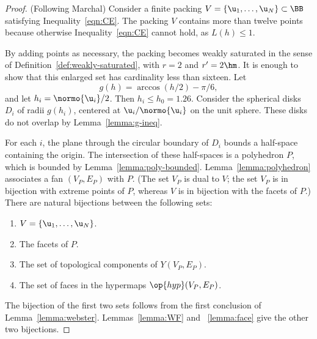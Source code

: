 \begin{proof} (Following Marchal) Consider a finite packing $
  V=\{\u_1,\ldots, \u_N\}\subset \BB$ satisfying
  Inequality~\ref{eqn:CE}.  The packing $V$ contains more than twelve
  points because otherwise Inequality~\ref{eqn:CE} cannot hold, as
  $L(h)\le 1$.

  By adding points as necessary, the packing becomes weakly saturated
  in the sense of Definition~\ref{def:weakly-saturated}, with $r=2$
  and $r'=2\hm$.  It is enough to show that this enlarged set has
  cardinality less than sixteen.  Let
\[ %
g(h) = \arccos(h/2) - \pi/6,  %
\] %
and let $h_i =
\normo{ \u_i}/2$.  Then $h_i\le h_0=1.26$.
Consider the spherical disks $D_i$ of radii $g(h_i)$,
centered at $ \u_i/\normo{ \u_i}$ on the unit sphere.  
These disks do not overlap by Lemma~\ref{lemma:g-ineq}.


%
For each $i$, the plane through the circular boundary of $D_i$ bounds
a half-space containing the origin.  The intersection of these
half-spaces is a polyhedron $P$, which is bounded by
Lemma~\ref{lemma:poly-bounded}.  Lemma~\ref{lemma:polyhedron}
associates a fan $(V_P,E_P)$ with $P$.  (The set $V_P$ is dual to $
V$; the set $V_P$ is in bijection with extreme points of $P$, whereas
$ V$ is in bijection with the facets of $P$.)  There are natural
bijections between the following sets:
\begin{enumerate}\wasitemize  
\item $ V = \{ \u_1,\ldots, \u_N\}$.
\item The  facets of $P$.
\item The set of  topological components of $Y(V_P,E_P)$.
\item The set of faces in the hypermaps $\op{hyp}(V_P,E_P)$.
\end{enumerate}\wasitemize 
The bijection of the first two sets follows from the first conclusion
of Lemma~\ref{lemma:webster}.  Lemmas~\ref{lemma:WF} and
~\ref{lemma:face} give the other two bijections.


\end{proof}
